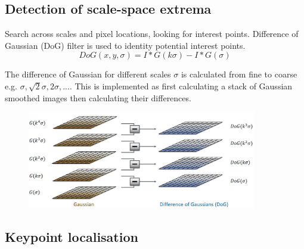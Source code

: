 \documentclass{report}
\begin{document}
\subsection{Detection of scale-space extrema}

Search across scales and pixel locations, looking for interest points.
Difference of Gaussian (DoG) filter is used to identity potential interest
points.
$$
    DoG(x,y,\sigma) = I * G(k \sigma) - I * G(\sigma)
$$

The difference of Gaussian for different scales $\sigma$ is calculated from fine
to coarse e.g. $\sigma, \sqrt{2}\sigma, 2\sigma, ...$. This is implemented as
first calculating a stack of Gaussian smoothed images then calculating their
differences.
\begin{figure}[h]
    \centering
    \includegraphics[width=10cm]{G to DoG.JPG}
\end{figure}

\subsection{Keypoint localisation}
\end{document}
